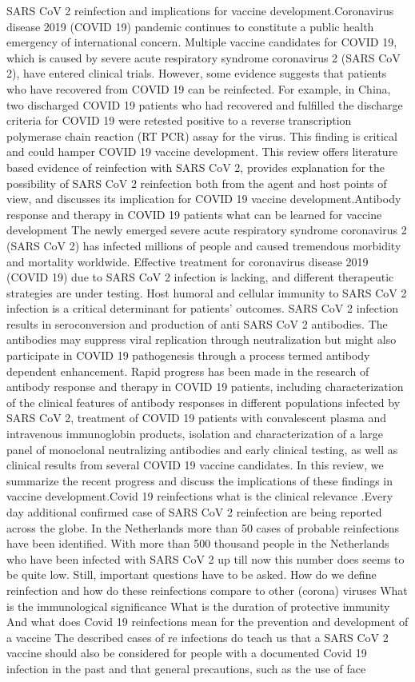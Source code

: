 \documentclass{qqtarticle}
\begin{document}
            SARS CoV 2 reinfection and implications for vaccine development.Coronavirus disease 2019 (COVID 19) pandemic continues to constitute a public health emergency of international concern. Multiple vaccine candidates for COVID 19, which is caused by severe acute respiratory syndrome coronavirus 2 (SARS CoV 2), have entered clinical trials. However, some evidence suggests that patients who have recovered from COVID 19 can be reinfected. For example, in China, two discharged COVID 19 patients who had recovered and fulfilled the discharge criteria for COVID 19 were retested positive to a reverse transcription polymerase chain reaction (RT PCR) assay for the virus. This finding is critical and could hamper COVID 19 vaccine development. This review offers literature based evidence of reinfection with SARS CoV 2, provides explanation for the possibility of SARS CoV 2 reinfection both from the agent and host points of view, and discusses its implication for COVID 19 vaccine development.Antibody response and therapy in COVID 19 patients  what can be learned for vaccine development The newly emerged severe acute respiratory syndrome coronavirus 2 (SARS CoV 2) has infected millions of people and caused tremendous morbidity and mortality worldwide. Effective treatment for coronavirus disease 2019 (COVID 19) due to SARS CoV 2 infection is lacking, and different therapeutic strategies are under testing. Host humoral and cellular immunity to SARS CoV 2 infection is a critical determinant for patients' outcomes. SARS CoV 2 infection results in seroconversion and production of anti SARS CoV 2 antibodies. The antibodies may suppress viral replication through neutralization but might also participate in COVID 19 pathogenesis through a process termed antibody dependent enhancement. Rapid progress has been made in the research of antibody response and therapy in COVID 19 patients, including characterization of the clinical features of antibody responses in different populations infected by SARS CoV 2, treatment of COVID 19 patients with convalescent plasma and intravenous immunoglobin products, isolation and characterization of a large panel of monoclonal neutralizing antibodies and early clinical testing, as well as clinical results from several COVID 19 vaccine candidates. In this review, we summarize the recent progress and discuss the implications of these findings in vaccine development.Covid 19 reinfections  what is the clinical relevance .Every day additional confirmed case of SARS CoV 2 reinfection are being reported across the globe. In the Netherlands more than 50 cases of probable reinfections have been identified. With more than 500 thousand people in the Netherlands who have been infected with SARS CoV 2 up till now this number does seems to be quite low. Still, important questions have to be asked. How do we define reinfection and how do these reinfections compare to other (corona) viruses  What is the immunological significance  What is the duration of protective immunity  And what does Covid 19 reinfections mean for the prevention and development of a vaccine  The described cases of re infections do teach us that a SARS CoV 2 vaccine should also be considered for people with a documented Covid 19 infection in the past and that general precautions, such as the use of face 
\end{document}
